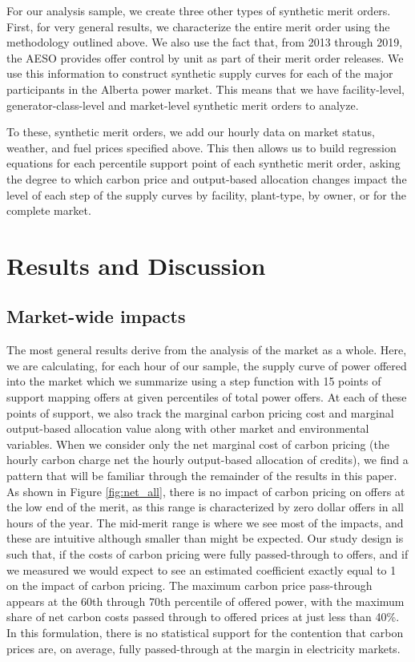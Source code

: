 \documentclass[12pt]{article}
\begin{document}
For our analysis sample, we create three other types of synthetic merit orders. First, for very general results, we characterize the entire merit order using the methodology outlined above. We also use the fact that, from 2013 through 2019, the AESO provides offer control by unit as part of their merit order releases. We use this information to construct synthetic supply curves for each of the major participants in the Alberta power market. This means that we have facility-level, generator-class-level and market-level synthetic merit orders to analyze.

To these, synthetic merit orders, we add our hourly data on market status, weather, and fuel prices specified above. This then allows us to build regression equations for each percentile support point of each synthetic merit order, asking the degree to which carbon price and output-based allocation changes impact the level of each step of the supply curves by facility, plant-type, by owner, or for the complete market.

\section{Results and Discussion}


\subsection{Market-wide impacts}
The most general results derive from the analysis of the market as a whole. Here, we are calculating, for each hour of our sample, the supply curve of power offered into the market which we summarize using a step function with 15 points of support mapping offers at given percentiles of total power offers. At each of these points of support, we also track the marginal carbon pricing cost and marginal output-based allocation value along with other market and environmental variables. When we consider only the net marginal cost of carbon pricing (the hourly carbon charge net the hourly output-based allocation of credits), we find a pattern that will be familiar through the remainder of the results in this paper. As shown in Figure \ref{fig:net_all}, there is no impact of carbon pricing on offers at the low end of the merit, as this range is characterized by zero dollar offers in all hours of the year. The mid-merit range is where we see most of the impacts, and these are intuitive although smaller than might be expected. Our study design is such that, if the costs of carbon pricing were fully passed-through to offers, and if we measured we would expect to see an estimated coefficient exactly equal to 1 on the impact of carbon pricing. The maximum carbon price pass-through appears at the 60th through 70th percentile of offered power, with the maximum share of net carbon costs passed through to offered prices at just less than 40\%. In this formulation, there is no statistical support for the contention that carbon prices are, on average, fully passed-through at the margin in electricity markets.
\end{document}
